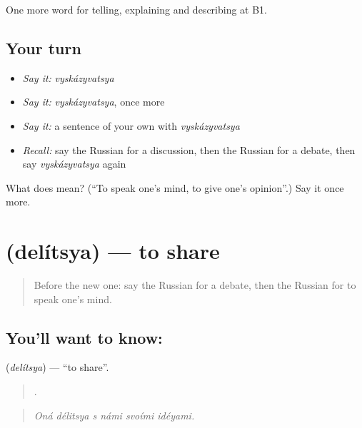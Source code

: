 \begin{grammarlens}[title={What you've built}]
One more word for telling, explaining and describing at B1.
\end{grammarlens}

\subsection*{Your turn}
\begin{itemize}
\raggedright
  \item \emph{Say it:} \emph{vyskázyvatsya}
  \item \emph{Say it:} \emph{vyskázyvatsya}, once more
  \item \emph{Say it:} a sentence of your own with \emph{vyskázyvatsya}
  \item \emph{Recall:} say the Russian for a discussion, then the Russian for a debate, then say \emph{vyskázyvatsya} again
\end{itemize}

\begin{tcolorbox}[breakable,colback=teal!4,colframe=teal!35!black,title={Before you move on}]
What does  mean? (\textquotedblleft{}To speak one’s mind, to give one’s opinion\textquotedblright{}.) Say it once more.
\end{tcolorbox}
\section[\texorpdfstring{\ru{делиться} (delítsya)}{делиться (delítsya)}]{ (delítsya) — to share}

\label{lesson:RU-C342-delitsya}



\begin{quote}
Before the new one: say the Russian for a debate, then the Russian for to speak one’s mind.
\end{quote}

\subsection*{You'll want to know: }
\textbf{} (\emph{delítsya}) — \textquotedblleft{}to share\textquotedblright{}.

\begin{quote}
     .
\end{quote}

\begin{quote}
\emph{Oná délitsya s námi svoími idéyami.}
\end{quote}

